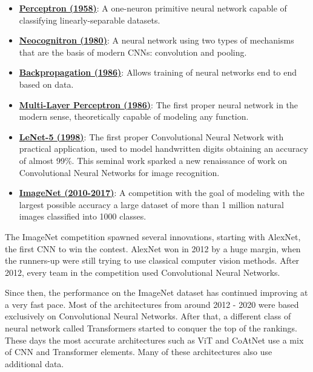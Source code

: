 \begin{itemize}
    \item \href{https://news.cornell.edu/stories/2019/09/professors-perceptron-paved-way-ai-60-years-too-soon}{\textbf{Perceptron (1958)}}: A one-neuron primitive neural network capable of classifying linearly-separable datasets.
    \item \href{https://en.wikipedia.org/wiki/Neocognitron\#:~:text=The\%20neocognitron\%20is\%20a\%20hierarchical,inspiration\%20for\%20convolutional\%20neural\%20networks.}{\textbf{Neocognitron (1980)}}: A neural network using two types of mechanisms that are the basis of modern CNNs: convolution and pooling.
    \item \href{https://en.wikipedia.org/wiki/Backpropagation\#History}{\textbf{Backpropagation (1986)}}: Allows training of neural networks end to end based on data.
    \item \href{https://en.wikipedia.org/wiki/Multilayer_perceptron}{\textbf{Multi-Layer Perceptron (1986)}}: The first proper neural network in the modern sense, theoretically capable of modeling any function.
    \item \href{http://yann.lecun.com/exdb/lenet/}{\textbf{LeNet-5 (1998)}}: The first proper Convolutional Neural Network with practical application, used to model handwritten digits obtaining an accuracy of almost 99\%. This seminal work sparked a new renaissance of work on Convolutional Neural Networks for image recognition.
    \item \href{https://qz.com/1034972/the-data-that-changed-the-direction-of-ai-research-and-possibly-the-world/}{\textbf{ImageNet (2010-2017)}}: A competition with the goal of modeling with the largest possible accuracy a large dataset of more than 1 million natural images classified into 1000 classes.
\end{itemize}
The ImageNet competition spawned several innovations, starting with AlexNet, the first CNN to win the contest. AlexNet won in 2012 by a huge margin, when the runners-up were still trying to use classical computer vision methods. After 2012, every team in the competition used Convolutional Neural Networks.

Since then, the performance on the ImageNet dataset has continued improving at a very fast pace. Most of the architectures from around 2012 - 2020 were based exclusively on Convolutional Neural Networks. After that, a different class of neural network called Transformers started to conquer the top of the rankings. These days the most accurate architectures such as ViT and CoAtNet use a mix of CNN and Transformer elements. Many of these architectures also use additional data.

